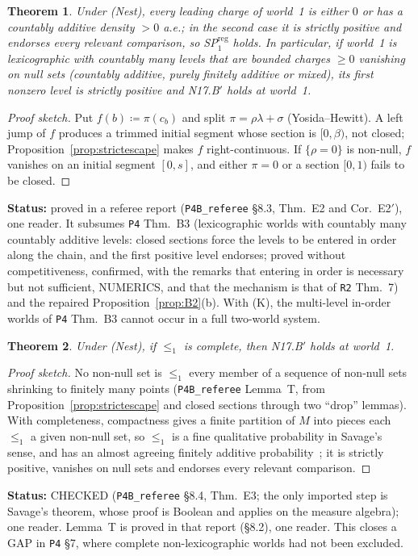 \documentclass[11pt]{article}
\newtheorem{theorem}{Theorem}[section]
\theoremstyle{definition}
\theoremstyle{remark}
\newcommand{\src}[1]{\texttt{#1}}
\newcommand{\status}[1]{\par\smallskip\noindent\textbf{Status:} #1\par\smallskip}
\begin{document}
\begin{theorem}\label{thm:E2}
Under (Nest), every leading charge of world~1 is either $0$ or has a countably additive density $>0$ a.e.; in the second case it is strictly positive and endorses every relevant comparison, so SP$^{\mathrm{reg}}_1$ holds. In particular, if world~1 is lexicographic with countably many levels that are bounded charges $\ge0$ vanishing on null sets (countably additive, purely finitely additive or mixed), its first nonzero level is strictly positive and N17.B$'$ holds at world~1.
\end{theorem}
\begin{proof}[Proof sketch]
Put $f(b)\coloneqq\pi(c_b)$ and split $\pi=\rho\lambda+\sigma$ (Yosida--Hewitt). A left jump of $f$ produces a trimmed initial segment whose section is $[0,\beta)$, not closed; Proposition~\ref{prop:strictescape} makes $f$ right-continuous. If $\{\rho=0\}$ is non-null, $f$ vanishes on an initial segment $[0,s]$, and either $\pi=0$ or a section $[0,1)$ fails to be closed.
\end{proof}
\status{proved in a referee report (\src{P4B\_referee} \S8.3, Thm.~E2 and Cor.~E2$'$), one reader. It subsumes \src{P4} Thm.~B3 (lexicographic worlds with countably many countably additive levels: closed sections force the levels to be entered in order along the chain, and the first positive level endorses; proved without competitiveness, confirmed, with the remarks that entering in order is necessary but not sufficient, NUMERICS, and that the mechanism is that of \src{R2} Thm.~7) and the repaired Proposition~\ref{prop:B2}(b). With (K), the multi-level in-order worlds of \src{P4} Thm.~B3 cannot occur in a full two-world system.}

\begin{theorem}\label{thm:E3}
Under (Nest), if $\le_1$ is complete, then N17.B$'$ holds at world~1.
\end{theorem}
\begin{proof}[Proof sketch]
No non-null set is $\le_1$ every member of a sequence of non-null sets shrinking to finitely many points (\src{P4B\_referee} Lemma~T, from Proposition~\ref{prop:strictescape} and closed sections through two ``drop'' lemmas). With completeness, compactness gives a finite partition of $M$ into pieces each $\le_1$ a given non-null set, so $\le_1$ is a fine qualitative probability in Savage's sense, and has an almost agreeing finitely additive probability~\cite{Sav1954,Fis1986}; it is strictly positive, vanishes on null sets and endorses every relevant comparison.
\end{proof}
\status{CHECKED (\src{P4B\_referee} \S8.4, Thm.~E3; the only imported step is Savage's theorem, whose proof is Boolean and applies on the measure algebra); one reader. Lemma~T is proved in that report (\S8.2), one reader. This closes a GAP in \src{P4} \S7, where complete non-lexicographic worlds had not been excluded.}
\end{document}
